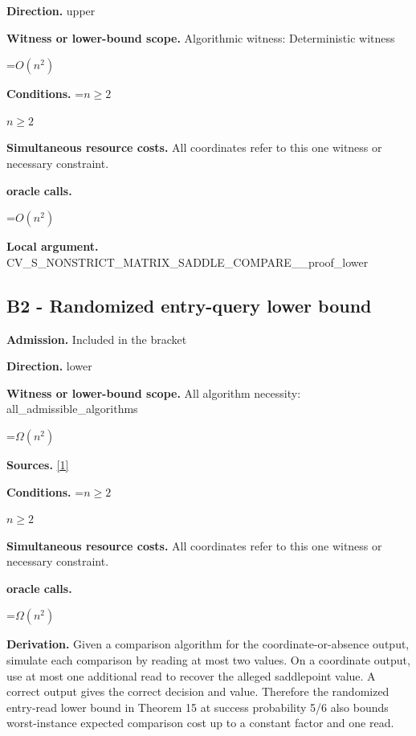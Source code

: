 \documentclass[10pt,a4paper]{article}
\newcommand{\AtlasMath}[1]{\par\begingroup\centering\setbox0=\hbox{$\displaystyle #1$}\ifdim\wd0>1.4\linewidth\typeout{ATLAS WIDE FORMULA: \the\wd0}\fi\ifdim\wd0>\linewidth\resizebox{\linewidth}{!}{\box0}\else\box0\fi\par\endgroup}
\newcommand{\AtlasInlineMath}[1]{\begingroup\setbox0=\hbox{$#1$}\ifdim\wd0>.4\linewidth\endgroup\AtlasMath{#1}\else\endgroup$#1$\fi}
\begin{document}
\textbf{Direction.} upper



\textbf{Witness or lower-bound scope.} Algorithmic witness: Deterministic witness



\AtlasMath{O(n^2)}


\textbf{Conditions.} \AtlasInlineMath{n\ge2}



\textbf{Simultaneous resource costs.} All coordinates refer to this one witness or necessary constraint.



\textbf{oracle calls.}



\AtlasMath{O(n^2)}


\textbf{Local argument.} CV\_S\_NONSTRICT\_MATRIX\_SA\allowbreak{}DDLE\_COMPARE\_\_proof\_lowe\allowbreak{}r



\subsection{B2 - Randomized entry-query lower bound}


\textbf{Admission.} Included in the bracket



\textbf{Direction.} lower



\textbf{Witness or lower-bound scope.} All algorithm necessity: all\_admissible\_algorithms



\AtlasMath{\Omega(n^2)}


\textbf{Sources.} \href{https://doi.org/10.4230/LIPIcs.ESA.2024.44}{[1]}



\textbf{Conditions.} \AtlasInlineMath{n\ge2}



\textbf{Simultaneous resource costs.} All coordinates refer to this one witness or necessary constraint.



\textbf{oracle calls.}



\AtlasMath{\Omega(n^2)}


\textbf{Derivation.} Given a comparison algorithm for the coordinate-or-absence output, simulate each comparison by reading at most two values. On a coordinate output, use at most one additional read to recover the alleged saddlepoint value. A correct output gives the correct decision and value. Therefore the randomized entry-read lower bound in Theorem 15 at success probability 5/6 also bounds worst-instance expected comparison cost up to a constant factor and one read.
\end{document}

